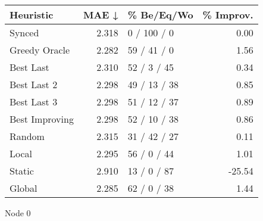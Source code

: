 \begin{tabular}{lrlr}
\toprule
\textbf{Heuristic} & \textbf{MAE ↓} & \textbf{\% Be/Eq/Wo} & \textbf{\% Improv.} \\
\midrule
            Synced &          2.318 &          0 / 100 / 0 &                0.00 \\
     Greedy Oracle &          2.282 &          59 / 41 / 0 &                1.56 \\
         Best Last &          2.310 &          52 / 3 / 45 &                0.34 \\
       Best Last 2 &          2.298 &         49 / 13 / 38 &                0.85 \\
       Best Last 3 &          2.298 &         51 / 12 / 37 &                0.89 \\
    Best Improving &          2.298 &         52 / 10 / 38 &                0.86 \\
            Random &          2.315 &         31 / 42 / 27 &                0.11 \\
             Local &          2.295 &          56 / 0 / 44 &                1.01 \\
            Static &          2.910 &          13 / 0 / 87 &              -25.54 \\
            Global &          2.285 &          62 / 0 / 38 &                1.44 \\
\bottomrule
\end{tabular}
\caption{Node 0}
\label{tab:hr_iid_lr01_le1_bs4_0}
